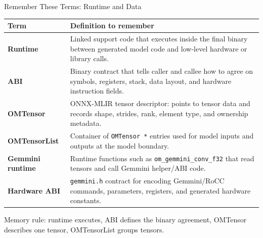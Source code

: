 \documentclass[aspectratio=169,10pt]{beamer}
\newcommand{\code}[1]{\texttt{\footnotesize #1}}
\newcommand{\edgeword}[1]{\textcolor{red!75!black}{\textbf{#1}}}
\begin{document}
\begin{frame}{Remember These Terms: Runtime and Data}
  \scriptsize
  \begin{tabularx}{\textwidth}{@{}lX@{}}
    \toprule
    Term & Definition to remember \\
    \midrule
    \edgeword{Runtime} &
      Linked support code that executes inside the final binary between generated model code and low-level hardware or library calls. \\
    \edgeword{ABI} &
      Binary contract that tells caller and callee how to agree on symbols, registers, stack, data layout, and hardware instruction fields. \\
    \edgeword{OMTensor} &
      ONNX-MLIR tensor descriptor: points to tensor data and records shape, strides, rank, element type, and ownership metadata. \\
    \edgeword{OMTensorList} &
      Container of \code{OMTensor *} entries used for model inputs and outputs at the model boundary. \\
    \edgeword{Gemmini runtime} &
      Runtime functions such as \code{om\_gemmini\_conv\_f32} that read tensors and call Gemmini helper/ABI code. \\
    \edgeword{Hardware ABI} &
      \code{gemmini.h} contract for encoding Gemmini/RoCC commands, parameters, registers, and generated hardware constants. \\
    \bottomrule
  \end{tabularx}
  \vspace{0.35em}
  {\tiny\color{codegray}
  Memory rule: runtime executes, ABI defines the binary agreement, OMTensor describes one tensor, OMTensorList groups tensors.}
\end{frame}
\end{document}
